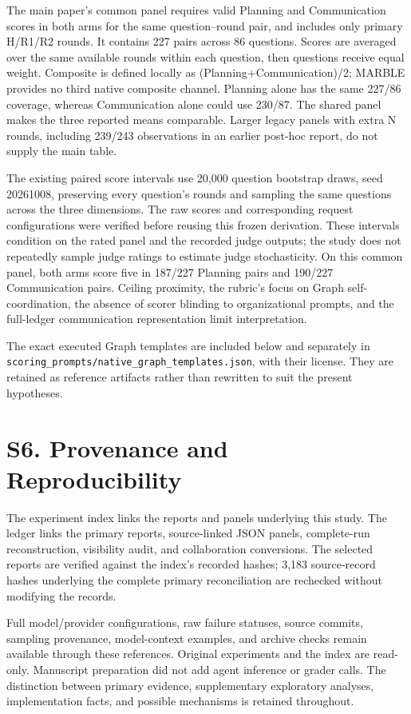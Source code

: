 \documentclass[10pt,letterpaper,twocolumn]{article}
\begin{document}
The main paper's common panel requires valid Planning and Communication scores in both arms for the same question--round pair, and includes only primary H/R1/R2 rounds. It contains 227 pairs across 86 questions. Scores are averaged over the same available rounds within each question, then questions receive equal weight. Composite is defined locally as (Planning+Communication)/2; MARBLE provides no third native composite channel. Planning alone has the same 227/86 coverage, whereas Communication alone could use 230/87. The shared panel makes the three reported means comparable. Larger legacy panels with extra N rounds, including 239/243 observations in an earlier post-hoc report, do not supply the main table.


The existing paired score intervals use 20,000 question bootstrap draws, seed 20261008, preserving every question's rounds and sampling the same questions across the three dimensions. The raw scores and corresponding request configurations were verified before reusing this frozen derivation. These intervals condition on the rated panel and the recorded judge outputs; the study does not repeatedly sample judge ratings to estimate judge stochasticity. On this common panel, both arms score five in 187/227 Planning pairs and 190/227 Communication pairs. Ceiling proximity, the rubric's focus on Graph self-coordination, the absence of scorer blinding to organizational prompts, and the full-ledger communication representation limit interpretation.


The exact executed Graph templates are included below and separately in \nolinkurl{scoring_prompts/native_graph_templates.json}, with their license. They are retained as reference artifacts rather than rewritten to suit the present hypotheses.


\section*{S6. Provenance and Reproducibility}

The experiment index links the reports and panels underlying this study. The ledger links the primary reports, source-linked JSON panels, complete-run reconstruction, visibility audit, and collaboration conversions. The selected reports are verified against the index's recorded hashes; 3,183 source-record hashes underlying the complete primary reconciliation are rechecked without modifying the records. 


Full model/provider configurations, raw failure statuses, source commits, sampling provenance, model-context examples, and archive checks remain available through these references. Original experiments and the index are read-only. Manuscript preparation did not add agent inference or grader calls. The distinction between primary evidence, supplementary exploratory analyses, implementation facts, and possible mechanisms is retained throughout.
\end{document}
